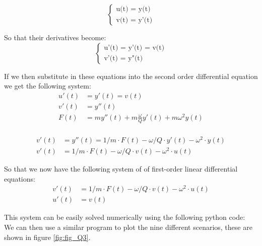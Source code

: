 \begin{equation*}
    \left\{ \begin{matrix} \mbox{u(t) = y(t)}\\
    \mbox{v(t) = y'(t)} \end{matrix} \right.
\end{equation*}

So that their derivatives become:\\

\begin{equation*}
    \left\{ \begin{matrix} \mbox{u'(t) = y'(t) = v(t)}\\
    \mbox{v'(t) = y"(t)} \end{matrix} \right.
\end{equation*}

If we then substitute in these equations into the second order differential equation we get the following system:\\

\begin{align*}
    u'(t) &= y'(t) = v(t)\\
    v'(t) &= y''(t)\\
    F(t) &= m y''(t)+m\frac{\omega}{Q}y'(t)+m \omega^2 y(t)\\
\end{align*}

\begin{align*}
    v'(t) &= y''(t) = 1/m \cdot F(t) - \omega/Q\cdot y'(t)-\omega^2\cdot y(t)\\
    v'(t) &= 1/m\cdot F(t) - \omega/Q\cdot v(t)-\omega^2\cdot u(t)
\end{align*}

So that we now have the following system of of first-order linear differential equations:\\

\begin{align}
    v'(t) &= 1/m\cdot F(t)-\omega/Q\cdot v(t)- \omega^2\cdot u(t)\\
    u'(t) &= v(t)
\end{align}

This system can be easily solved numerically using the following python code:\\




We can then use a similar program to plot the nine different scenarios, these are shown in figure \ref{fig:fig_Q3}.

